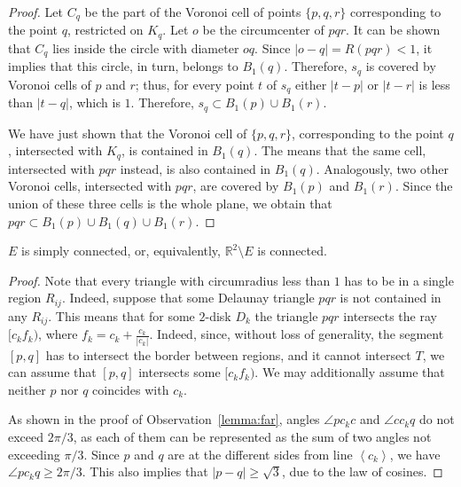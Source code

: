 \begin{appendices}
\begin{proof}
Let $C_q$ be the part of the Voronoi cell of points $\{p, q, r\}$ corresponding to the point $q$, restricted on $K_q$. Let $o$ be the circumcenter of $pqr$. It can be shown that $C_q$ lies inside the circle with diameter $oq$. Since $|o - q| = R(pqr) < 1$, it implies that this circle, in turn, belongs to $B_1(q)$. Therefore, $s_q$ is covered by Voronoi cells of $p$ and $r$; thus, for every point $t$ of $s_q$ either $|t - p|$ or $|t - r|$ is less than $|t - q|$, which is $1$. Therefore, $s_q\subset B_1(p)\cup B_1(r)$.

We have just shown that the Voronoi cell of $\{p, q, r\}$, corresponding to the point $q$, intersected with $K_q$, is contained in $B_1(q)$. The means that the same cell, intersected with $pqr$ instead, is also contained in $B_1(q)$. Analogously, two other Voronoi cells, intersected with $pqr$, are covered by $B_1(p)$ and $B_1(r)$. Since the union of these three cells is the whole plane, we obtain that $pqr\subset B_1(p)\cup B_1(q)\cup B_1(r)$.
\end{proof}

\begin{lemma}\label{lemma:E-is-connected}
$E$ is simply connected, or, equivalently, $\mathbb{R}^2\setminus E$ is connected.
\end{lemma}

\begin{proof}
Note that every triangle with circumradius less than $1$ has to be in a single region $R_{ij}$.
Indeed, suppose that some Delaunay triangle $pqr$ is not contained in any $R_{ij}$. This means that for some $2$-disk $D_k$ the triangle $pqr$ intersects the ray $[c_kf_k)$, where $f_k = c_k + \frac{c_k}{|c_k|}$.
Indeed, since, without loss of generality, the segment $[p, q]$ has to intersect the border between regions, and it cannot intersect $T$, we can assume that $[p, q]$ intersects some $[c_kf_k)$. We may additionally assume that neither $p$ nor $q$ coincides with $c_k$.

As shown in the proof of Observation~\ref{lemma:far}, angles $\angle pc_kc$ and $\angle cc_kq$ do not exceed $2\pi/3$, as each of them can be represented as the sum of two angles not exceeding $\pi/3$. Since $p$ and $q$ are at the different sides from line $\left<c_k\right>$, we have $\angle pc_kq\geq2\pi/3$. This also implies that $|p - q|\geq \sqrt{3}$, due to the law of cosines.


\end{proof}
\end{appendices}
